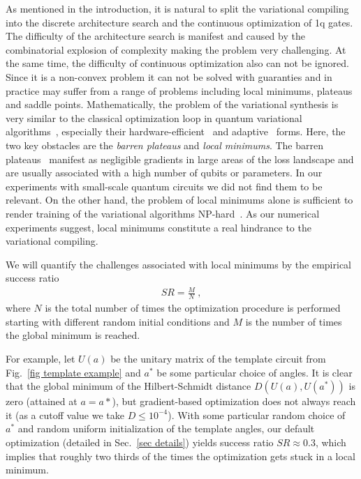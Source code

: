 \documentclass[twocolumn, amsfonts, amssymb, aps, nofootinbib]{revtex4-2}
\begin{document}
As mentioned in the introduction, it is natural to split the variational compiling into the discrete architecture search and the continuous optimization of 1q gates. The difficulty of the architecture search is manifest and caused by the combinatorial explosion of complexity making the problem very challenging. At the same time, the difficulty of continuous optimization also can not be ignored. Since it is a non-convex problem it can not be solved with guaranties and in practice may suffer from a range of problems including local minimums, plateaus and saddle points. Mathematically, the problem of the variational synthesis is very similar to the classical optimization loop in quantum variational algorithms~\cite{McClean2016}, especially their hardware-efficient~\cite{Kandala2017} and adaptive~\cite{Tang2021} forms. Here, the two key obstacles are the \textit{barren plateaus} and \textit{local minimums}. The barren plateaus~\cite{McClean2018} manifest as negligible gradients in large areas of the loss landscape and are usually associated with a high number of qubits or parameters. In our experiments with small-scale quantum circuits we did not find them to be relevant. On the other hand, the problem of local minimums alone is sufficient to render training of the variational algorithms NP-hard~\cite{Bittel2021}. As our numerical experiments suggest, local minimums constitute a real hindrance to the variational compiling.

We will quantify the challenges associated with local minimums by the empirical success ratio
\begin{align}
	SR=\frac{M}{N} \ ,
\end{align}
where $N$ is the total number of times the optimization procedure is performed starting with different random initial conditions and $M$ is the number of times the global minimum is reached.

For example, let $U(a)$ be the unitary matrix of the template circuit from Fig.~\ref{fig template example} and $a^*$ be some particular choice of angles. It is clear that the global minimum of the Hilbert-Schmidt distance $D(U(a), U(a^*))$ is zero (attained at $a=a*$), but gradient-based optimization does not always reach it (as a cutoff value we take $D\le 10^{-4}$). With some particular random choice of $a^*$ and random uniform initialization of the template angles, our default optimization (detailed in Sec.~\ref{sec details}) yields success ratio $SR\approx0.3$, which implies that roughly two thirds of the times the optimization gets stuck in a local minimum.
\end{document}
